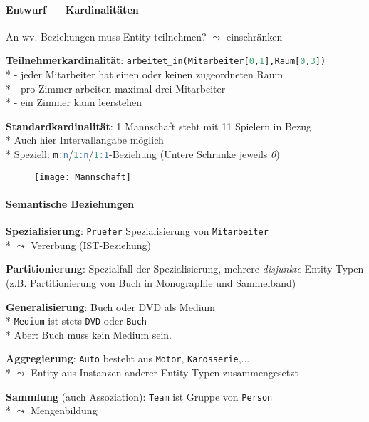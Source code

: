 \paragraph{Entwurf --- Kardinalitäten}
\begin{items}
	\item An wv. Beziehungen muss Entity teilnehmen? \( \leadsto \) einschränken
	\item \textbf{Teilnehmerkardinalität}: \lstinline[language=sql]{arbeitet_in(Mitarbeiter[0,1],Raum[0,3])} \\*
		- jeder Mitarbeiter hat einen oder keinen zugeordneten Raum \\*
	 	- pro Zimmer arbeiten maximal drei Mitarbeiter \\*
	 	- ein Zimmer kann leerstehen
	 \item \textbf{Standardkardinalität}: 1 Mannschaft steht mit 11 Spielern in Bezug \\*
	 Auch hier Intervallangabe möglich\\*
	  Speziell: \lstinline[language=sql]{m:n}/\lstinline[language=sql]{1:n}/\lstinline[language=sql]{1:1}-Beziehung (Untere Schranke jeweils \emph{0})
	 \begin{figure}[H]\centering\label{Mannschaft}\texttt{[image: Mannschaft]}\end{figure}
\end{items}





\paragraph{Semantische Beziehungen}
\begin{items}
	\item \textbf{Spezialisierung}: \lstinline[language=sql]{Pruefer} Spezialisierung von \lstinline[language=sql]{Mitarbeiter} \\* \( \leadsto \) Vererbung (IST-Beziehung)
	\item \textbf{Partitionierung}: Spezialfall der Spezialisierung, mehrere \emph{disjunkte} Entity-Typen (z.B. Partitionierung von Buch in Monographie und Sammelband)
	\item \textbf{Generalisierung}: Buch oder DVD als Medium \\*
	\lstinline[language=sql]{Medium} ist stets \lstinline[language=sql]{DVD} oder \lstinline[language=sql]{Buch} \\* Aber: Buch muss kein Medium sein.
	\item \textbf{Aggregierung}: \lstinline[language=sql]{Auto} besteht aus \lstinline[language=sql]{Motor}, \lstinline[language=sql]{Karosserie},... \\* \( \leadsto \) Entity aus Instanzen anderer Entity-Typen zusammengesetzt
	\item \textbf{Sammlung} (auch Assoziation): \lstinline[language=sql]{Team} ist Gruppe von \lstinline[language=sql]{Person} \\* \( \leadsto \) Mengenbildung
\end{items}

